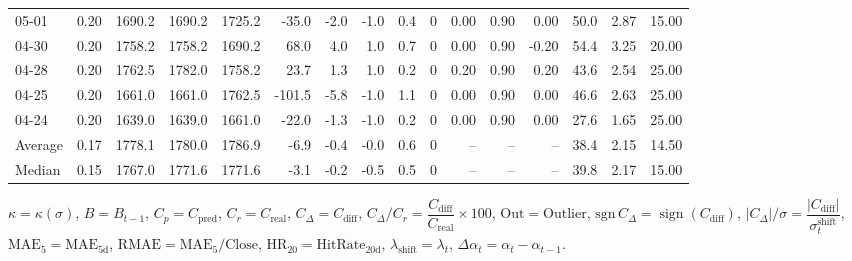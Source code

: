 \begin{threeparttable}
{\begin{tabular}{lrrrrrrrrrrrrrrr}
  05-01 &     0.20 & 1690.2 & 1690.2 & 1725.2 &      -35.0 &           -2.0 &                     -1.0 &                 0.4 &              0 &       0.00 &      0.90 &           0.00 &             50.0 &            2.87 &                  15.00 \\
  04-30 &     0.20 & 1758.2 & 1758.2 & 1690.2 &       68.0 &            4.0 &                      1.0 &                 0.7 &              0 &       0.00 &      0.90 &          -0.20 &             54.4 &            3.25 &                  20.00 \\
  04-28 &     0.20 & 1762.5 & 1782.0 & 1758.2 &       23.7 &            1.3 &                      1.0 &                 0.2 &              0 &       0.20 &      0.90 &           0.20 &             43.6 &            2.54 &                  25.00 \\
  04-25 &     0.20 & 1661.0 & 1661.0 & 1762.5 &     -101.5 &           -5.8 &                     -1.0 &                 1.1 &              0 &       0.00 &      0.90 &           0.00 &             46.6 &            2.63 &                  25.00 \\
  04-24 &     0.20 & 1639.0 & 1639.0 & 1661.0 &      -22.0 &           -1.3 &                     -1.0 &                 0.2 &              0 &       0.00 &      0.90 &           0.00 &             27.6 &            1.65 &                  25.00 \\
Average &     0.17 & 1778.1 & 1780.0 & 1786.9 &       -6.9 &           -0.4 &                     -0.0 &                 0.6 &              0 &         -- &        -- &             -- &             38.4 &            2.15 &                  14.50 \\
 Median &     0.15 & 1767.0 & 1771.6 & 1771.6 &       -3.1 &           -0.2 &                     -0.5 &                 0.5 &              0 &         -- &        -- &             -- &             39.8 &            2.17 &                  15.00 \\
\bottomrule
\end{tabular}
}
\begin{tablenotes}\footnotesize
\item $\kappa=\kappa(\sigma)$, $B=B_{t-1}$, $C_p=C_{\text{pred}}$, $C_r=C_{\text{real}}$, $C_\Delta=C_{\text{diff}}$, $C_\Delta/C_r=\dfrac{C_{\text{diff}}}{C_{\text{real}}}\times100$, $\mathrm{Out}=\text{Outlier}$, $\mathrm{sgn}\,C_\Delta=\operatorname{sign}(C_{\text{diff}})$, $|C_\Delta|/\sigma=\dfrac{|C_{\text{diff}}|}{\sigma_t^{\text{shift}}}$, $\mathrm{MAE}_5=\mathrm{MAE}_{5\text{d}}$, $\mathrm{RMAE}= \mathrm{MAE}_5 / \text{Close}$, $\mathrm{HR}_{20}=\mathrm{HitRate}_{20\text{d}}$, 
$\lambda_{\text{shift}}=\lambda_t$, 
$\Delta\alpha_t=\alpha_t-\alpha_{t-1}$.
\end{tablenotes}
\end{threeparttable}
\endgroup

